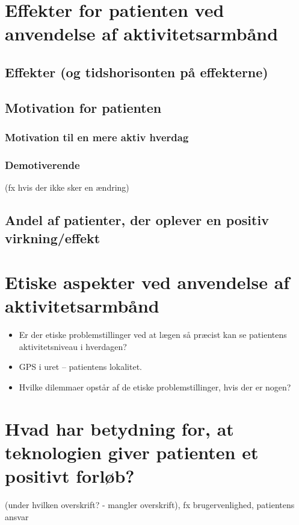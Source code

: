 \section{Effekter for patienten ved anvendelse af aktivitetsarmbånd}
\subsection{Effekter (og tidshorisonten på effekterne)}
\subsection{Motivation for patienten}
\subsubsection{Motivation til en mere aktiv hverdag}
\subsubsection{Demotiverende}
(fx hvis der ikke sker en ændring)
\subsection{Andel af patienter, der oplever en positiv virkning/effekt}

\section{Etiske aspekter ved anvendelse af aktivitetsarmbånd}
\begin{itemize}
\item Er der etiske problemstillinger ved at lægen så præcist kan se patientens aktivitetsniveau i hverdagen?
\item GPS i uret – patientens lokalitet.
\item Hvilke dilemmaer opstår af de etiske problemstillinger, hvis der er nogen?
\end{itemize}

\section{Hvad har betydning for, at teknologien giver patienten et positivt forløb?}
(under hvilken overskrift? - mangler overskrift), fx brugervenlighed, patientens ansvar 
